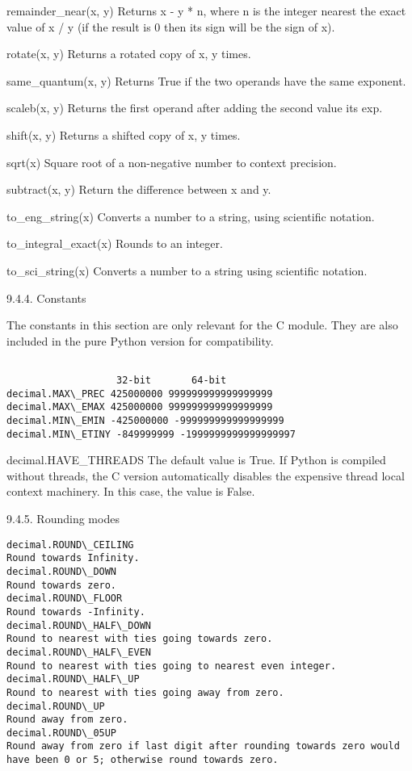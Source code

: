 remainder\_near(x, y)
Returns x - y * n, where n is the integer nearest the exact value of x / y (if the result is 0 then its sign will be the sign of x).

rotate(x, y)
Returns a rotated copy of x, y times.

same\_quantum(x, y)
Returns True if the two operands have the same exponent.

scaleb(x, y)
Returns the first operand after adding the second value its exp.

shift(x, y)
Returns a shifted copy of x, y times.

sqrt(x)
Square root of a non-negative number to context precision.

subtract(x, y)
Return the difference between x and y.

to\_eng\_string(x)
Converts a number to a string, using scientific notation.

to\_integral\_exact(x)
Rounds to an integer.

to\_sci\_string(x)
Converts a number to a string using scientific notation.


9.4.4. Constants

The constants in this section are only relevant for the C module. They are also included in the pure Python version for compatibility.










\begin{lstlisting}

                   32-bit       64-bit
decimal.MAX\_PREC 425000000 999999999999999999 
decimal.MAX\_EMAX 425000000 999999999999999999 
decimal.MIN\_EMIN -425000000 -999999999999999999 
decimal.MIN\_ETINY -849999999 -1999999999999999997 
\end{lstlisting}

decimal.HAVE\_THREADS
The default value is True. If Python is compiled without threads, the C version automatically disables the expensive thread local context machinery. In this case, the value is False.


9.4.5. Rounding modes

\begin{lstlisting}
decimal.ROUND\_CEILING
Round towards Infinity.
decimal.ROUND\_DOWN
Round towards zero.
decimal.ROUND\_FLOOR
Round towards -Infinity.
decimal.ROUND\_HALF\_DOWN
Round to nearest with ties going towards zero.
decimal.ROUND\_HALF\_EVEN
Round to nearest with ties going to nearest even integer.
decimal.ROUND\_HALF\_UP
Round to nearest with ties going away from zero.
decimal.ROUND\_UP
Round away from zero.
decimal.ROUND\_05UP
Round away from zero if last digit after rounding towards zero would have been 0 or 5; otherwise round towards zero.
\end{lstlisting}

